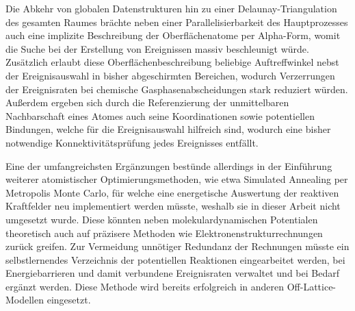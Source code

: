Die Abkehr von globalen Datenstrukturen hin zu einer Delaunay-Triangulation des gesamten Raumes brächte neben einer Parallelisierbarkeit des Hauptprozesses auch eine implizite Beschreibung der Oberflächenatome per Alpha-Form, womit die Suche bei der Erstellung von Ereignissen massiv beschleunigt würde.
Zusätzlich erlaubt diese Oberflächenbeschreibung beliebige Auftreffwinkel nebst der Ereignisauswahl in bisher abgeschirmten Bereichen, wodurch Verzerrungen der Ereignisraten bei chemische Gasphasenabscheidungen stark reduziert würden.
Außerdem ergeben sich durch die Referenzierung der unmittelbaren Nachbarschaft eines Atomes auch seine Koordinationen sowie potentiellen Bindungen, welche für die Ereignisauswahl hilfreich sind, wodurch eine bisher notwendige Konnektivitätsprüfung jedes Ereignisses entfällt.

Eine der umfangreichsten Ergänzungen bestünde allerdings in der Einführung weiterer atomistischer Optimierungsmethoden, wie etwa Simulated Annealing per Metropolis Monte Carlo, für welche eine energetische Auswertung der reaktiven Kraftfelder neu implementiert werden müsste, weshalb sie in dieser Arbeit nicht umgesetzt wurde.
Diese könnten neben molekulardynamischen Potentialen theoretisch auch auf präzisere Methoden wie Elektronenstrukturrechnungen zurück greifen.
Zur Vermeidung unnötiger Redundanz der Rechnungen müsste ein selbstlernendes Verzeichnis der potentiellen Reaktionen eingearbeitet werden, bei Energiebarrieren und damit verbundene Ereignisraten verwaltet und bei Bedarf ergänzt werden.
Diese Methode wird bereits erfolgreich in anderen Off-Lattice-Modellen eingesetzt\cite{biehl_off-lattice_2005,stamatakis_graph-theoretical_2011}.

